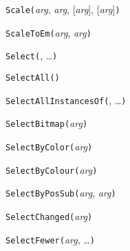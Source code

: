 

\texttt{Scale(}\textit{arg}, \textit{arg}, [\textit{arg}], [\textit{arg}]\texttt{)}



\texttt{ScaleToEm(}\textit{arg}, \textit{arg}\texttt{)}



\texttt{Select(}, \ldots\texttt{)}



\texttt{SelectAll(}\texttt{)}



\texttt{SelectAllInstancesOf(}, \ldots\texttt{)}



\texttt{SelectBitmap(}\textit{arg}\texttt{)}



\texttt{SelectByColor(}\textit{arg}\texttt{)}



\texttt{SelectByColour(}\textit{arg}\texttt{)}



\texttt{SelectByPosSub(}\textit{arg}, \textit{arg}\texttt{)}



\texttt{SelectChanged(}\textit{arg}\texttt{)}



\texttt{SelectFewer(}\textit{arg}, \ldots\texttt{)}


